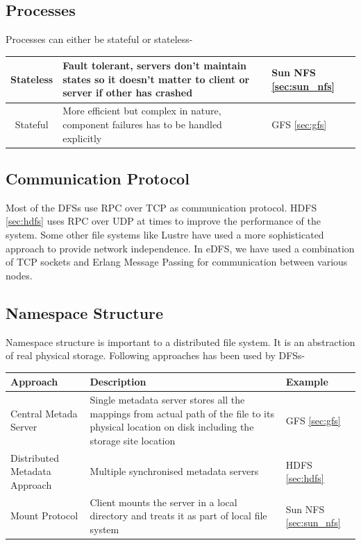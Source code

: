 \documentclass[a4paper,12pt]{article}
\begin{document}
\subsection{Processes}
Processes can either be stateful or stateless-

\begin{table}[h]
\begin{tabular}{|c|p{9cm}|p{2cm}|}
\hline 
Stateless & Fault tolerant, servers don't maintain states so it doesn't matter to client or server if other has crashed & Sun NFS \ref{sec:sun_nfs} \\ 
\hline 
Stateful & More efficient but complex in nature, component failures has to be handled explicitly & GFS \ref{sec:gfs} \\ 
\hline 
\end{tabular} 
\end{table}

\subsection{Communication Protocol}
Most of the DFSs use RPC over TCP as communication protocol. HDFS \ref{sec:hdfs} uses RPC over UDP at times to improve the performance of the system. Some other file systems like Lustre have used a more sophisticated approach to provide network independence. In eDFS, we have used a combination of TCP sockets and Erlang Message Passing for communication between various nodes.

\subsection{Namespace Structure}
Namespace structure is important to a distributed file system. It is an abstraction of real physical storage. Following approaches has been used by DFSs-

\begin{table}[h]
\begin{tabular}{|p{2.7cm}|p{8cm}|p{2cm}|}
\hline
\textbf{Approach} & \textbf{Description} & Example \\
\hline 
Central Metada Server & Single metadata server stores all the mappings from actual path of the file to its physical location on disk including the storage site location & GFS \ref{sec:gfs} \\ 
\hline 
Distributed Metadata Approach & Multiple synchronised metadata servers & HDFS \ref{sec:hdfs} \\ 
\hline 
Mount Protocol & Client mounts the server in a local directory and treats it as part of local file system & Sun NFS \ref{sec:sun_nfs} \\ 
\hline 
\end{tabular} 
\end{table}
\end{document}
